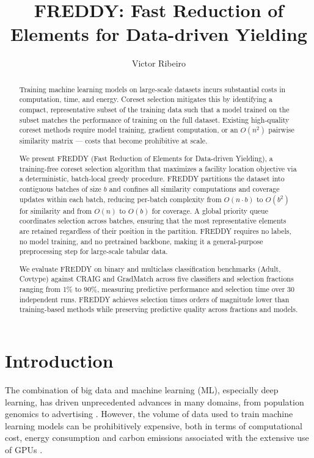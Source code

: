 \documentclass{article}
\title{FREDDY: Fast Reduction of Elements for Data-driven Yielding}
\author{Victor Ribeiro}
\begin{document}
\maketitle

\begin{abstract}
Training machine learning models on large-scale datasets incurs substantial costs in computation, time, and energy.
Coreset selection mitigates this by identifying a compact, representative subset of the training data such that a model trained on the subset matches the performance of training on the full dataset.
Existing high-quality coreset methods require model training, gradient computation, or an $O(n^2)$ pairwise similarity matrix — costs that become prohibitive at scale.

We present FREDDY (Fast Reduction of Elements for Data-driven Yielding), a training-free coreset selection algorithm that maximizes a facility location objective via a deterministic, batch-local greedy procedure.
FREDDY partitions the dataset into contiguous batches of size $b$ and confines all similarity computations and coverage updates within each batch, reducing per-batch complexity from $O(n \cdot b)$ to $O(b^2)$ for similarity and from $O(n)$ to $O(b)$ for coverage.
A global priority queue coordinates selection across batches, ensuring that the most representative elements are retained regardless of their position in the partition.
FREDDY requires no labels, no model training, and no pretrained backbone, making it a general-purpose preprocessing step for large-scale tabular data.

We evaluate FREDDY on binary and multiclass classification benchmarks (Adult, Covtype) against CRAIG and GradMatch across five classifiers and selection fractions ranging from 1\% to 90\%, measuring predictive performance and selection time over 30 independent runs.
FREDDY achieves selection times orders of magnitude lower than training-based methods while preserving predictive quality across fractions and models.
\end{abstract}


\section{Introduction}

The combination of big data and machine learning (ML), especially deep learning, has driven unprecedented advances in many domains, from population genomics to advertising \cite{Huggins2016, Weinreich2025Survey}. However, the volume of data used to train machine learning models can be prohibitively expensive, both in terms of computational cost, energy consumption and carbon emissions associated with the extensive use of GPUs \cite{MoseretalSurvey, Huggins2016}.
\end{document}
